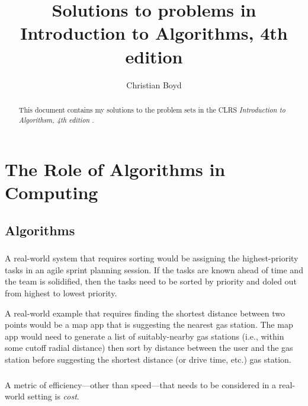 \documentclass{article}
\begin{document}
\title{Solutions to problems in Introduction to Algorithms, 4th edition}

\author{Christian Boyd}

\maketitle

\tableofcontents

\begin{abstract}
    This document contains my solutions to the problem sets in the CLRS {\it Introduction to Algorithsm, 4th edition} \cite{CLRS2022}.
\end{abstract}

\section{The Role of Algorithms in Computing}



\subsection{Algorithms}


\subsubsection{}
    A real-world system that requires sorting would be assigning the highest-priority tasks in an agile sprint planning session.  If the tasks are known ahead of time and the team is solidified, then the tasks need to be sorted by priority and doled out from highest to lowest priority.

    A real-world example that requires finding the shortest distance between two points would be a map app that is suggesting the nearest gas station.  The map app would need to generate a list of suitably-nearby gas stations (i.e., within some cutoff radial distance) then sort by distance between the user and the gas station before suggesting the shortest distance (or drive time, etc.) gas station.

\subsubsection{}
    A metric of efficiency---other than speed---that needs to be considered in a real-world setting is {\it cost}.
\end{document}

